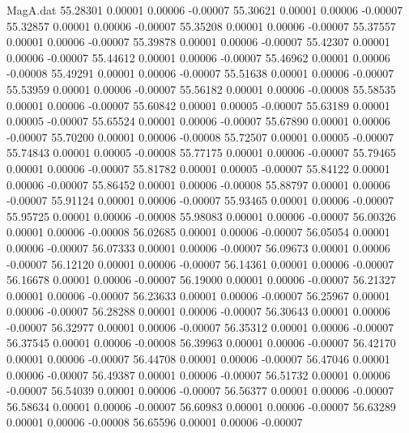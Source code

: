 \begin{filecontents}{MagA.dat}
  55.28301    0.00001    0.00006   -0.00007
  55.30621    0.00001    0.00006   -0.00007
  55.32857    0.00001    0.00006   -0.00007
  55.35208    0.00001    0.00006   -0.00007
  55.37557    0.00001    0.00006   -0.00007
  55.39878    0.00001    0.00006   -0.00007
  55.42307    0.00001    0.00006   -0.00007
  55.44612    0.00001    0.00006   -0.00007
  55.46962    0.00001    0.00006   -0.00008
  55.49291    0.00001    0.00006   -0.00007
  55.51638    0.00001    0.00006   -0.00007
  55.53959    0.00001    0.00006   -0.00007
  55.56182    0.00001    0.00006   -0.00008
  55.58535    0.00001    0.00006   -0.00007
  55.60842    0.00001    0.00005   -0.00007
  55.63189    0.00001    0.00005   -0.00007
  55.65524    0.00001    0.00006   -0.00007
  55.67890    0.00001    0.00006   -0.00007
  55.70200    0.00001    0.00006   -0.00008
  55.72507    0.00001    0.00005   -0.00007
  55.74843    0.00001    0.00005   -0.00008
  55.77175    0.00001    0.00006   -0.00007
  55.79465    0.00001    0.00006   -0.00007
  55.81782    0.00001    0.00005   -0.00007
  55.84122    0.00001    0.00006   -0.00007
  55.86452    0.00001    0.00006   -0.00008
  55.88797    0.00001    0.00006   -0.00007
  55.91124    0.00001    0.00006   -0.00007
  55.93465    0.00001    0.00006   -0.00007
  55.95725    0.00001    0.00006   -0.00008
  55.98083    0.00001    0.00006   -0.00007
  56.00326    0.00001    0.00006   -0.00008
  56.02685    0.00001    0.00006   -0.00007
  56.05054    0.00001    0.00006   -0.00007
  56.07333    0.00001    0.00006   -0.00007
  56.09673    0.00001    0.00006   -0.00007
  56.12120    0.00001    0.00006   -0.00007
  56.14361    0.00001    0.00006   -0.00007
  56.16678    0.00001    0.00006   -0.00007
  56.19000    0.00001    0.00006   -0.00007
  56.21327    0.00001    0.00006   -0.00007
  56.23633    0.00001    0.00006   -0.00007
  56.25967    0.00001    0.00006   -0.00007
  56.28288    0.00001    0.00006   -0.00007
  56.30643    0.00001    0.00006   -0.00007
  56.32977    0.00001    0.00006   -0.00007
  56.35312    0.00001    0.00006   -0.00007
  56.37545    0.00001    0.00006   -0.00008
  56.39963    0.00001    0.00006   -0.00007
  56.42170    0.00001    0.00006   -0.00007
  56.44708    0.00001    0.00006   -0.00007
  56.47046    0.00001    0.00006   -0.00007
  56.49387    0.00001    0.00006   -0.00007
  56.51732    0.00001    0.00006   -0.00007
  56.54039    0.00001    0.00006   -0.00007
  56.56377    0.00001    0.00006   -0.00007
  56.58634    0.00001    0.00006   -0.00007
  56.60983    0.00001    0.00006   -0.00007
  56.63289    0.00001    0.00006   -0.00008
  56.65596    0.00001    0.00006   -0.00007

\end{filecontents}
